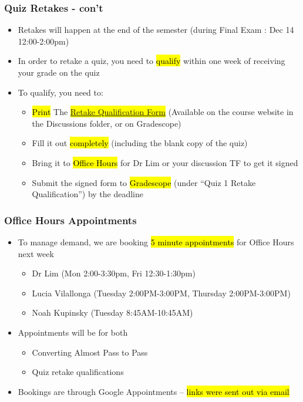 \begin{frame}
\frametitle{Quiz Retakes - con't}
    \begin{itemize}
        \item Retakes will happen at the end of the semester (during Final Exam : Dec 14 12:00-2:00pm)
        \item In order to retake a quiz, you need to \hl{qualify} within one week of receiving your grade on the quiz
        \item To qualify, you need to:
        \begin{itemize}
            \item \hl{Print} The \hl{\href{https://learn.bu.edu/ultra/courses/_246685_1/outline/file/_16630786_1}{Retake Qualification Form}} (Available on the course website in the Discussions folder, or on Gradescope)
            \item Fill it out \hl{completely} (including the blank copy of the quiz)
            \item Bring it to \hl{Office Hours} for Dr Lim or your discussion TF to get it signed
            \item Submit the signed form to \hl{Gradescope} (under ``Quiz 1 Retake Qualification'') by the deadline
        \end{itemize}
    \end{itemize}
\end{frame}

\begin{frame}
    \frametitle{Office Hours Appointments}
    \begin{itemize}
        \item To manage demand, we are booking \hl{5 minute appointments} for Office Hours next week
        \begin{itemize}
            \item Dr Lim (Mon 2:00-3:30pm, Fri 12:30-1:30pm)
            \item Lucia Vilallonga (Tuesday 2:00PM-3:00PM, Thursday 2:00PM-3:00PM)
            \item Noah Kupinsky (Tuesday 8:45AM-10:45AM)
        \end{itemize}
        \item Appointments will be for both
        \begin{itemize}
            \item Converting Almost Pass to Pass
            \item Quiz retake qualifications
        \end{itemize}
        \item Bookings are through Google Appointments -- \hl{links were sent out via email}
    \end{itemize}
\end{frame}